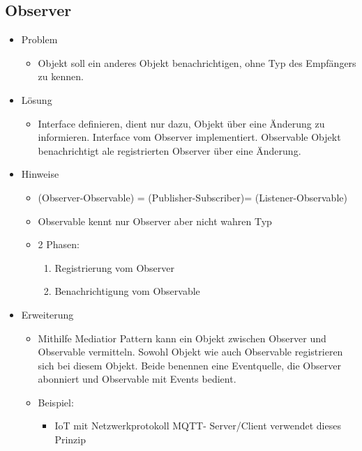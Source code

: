 \documentclass[../ZF_SWEN1.tex]{subfiles}
\begin{document}
\subsection{Observer}
\begin{itemize}
	\item Problem
	\begin{itemize}
		\item Objekt soll ein anderes Objekt benachrichtigen, ohne Typ des Empfängers zu kennen.
	\end{itemize}
	\item Lösung
	\begin{itemize}
		\item Interface definieren, dient nur dazu, Objekt über eine Änderung zu informieren. Interface vom Observer implementiert. Observable Objekt benachrichtigt ale registrierten Observer über eine Änderung.
	\end{itemize}
	\item Hinweise
	\begin{itemize}
		\item (Observer-Observable) = (Publisher-Subscriber)= (Listener-Observable)
		\item Observable kennt nur Observer aber nicht wahren Typ
		\item 2 Phasen:
		\begin{enumerate}
			\item Registrierung vom Observer
			\item Benachrichtigung vom Observable
		\end{enumerate}
	\end{itemize}
	\item Erweiterung
	\begin{itemize}
		\item Mithilfe Mediatior Pattern kann ein Objekt zwischen Observer und Observable vermitteln. Sowohl Objekt wie auch Observable registrieren sich bei diesem Objekt. Beide benennen eine Eventquelle, die Observer abonniert und Observable mit Events bedient.
		\item Beispiel:
		\begin{itemize}
			\item IoT mit Netzwerkprotokoll MQTT- Server/Client verwendet dieses Prinzip
		\end{itemize}
	\end{itemize}
\end{itemize}
\end{document}
